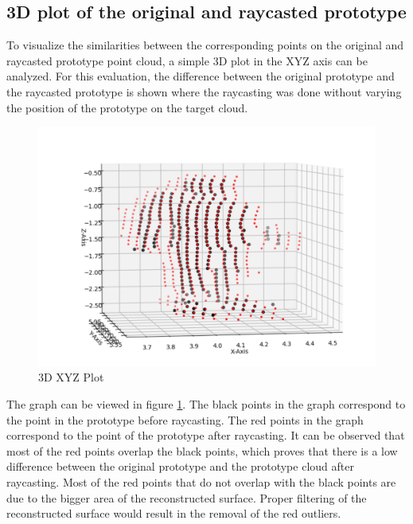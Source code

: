 \subsection{3D plot of the original and raycasted prototype}\label{sec:3dplot}
To visualize the similarities between the corresponding points on the original and raycasted prototype point cloud, a simple 3D plot in the XYZ axis can be analyzed. For this evaluation, the difference between the original prototype and the raycasted prototype is shown where the raycasting was done without varying the position of the prototype on the target cloud.

\begin{figure}[htbp]
    \centering
    \includegraphics[width=1\linewidth]{97_graphics/evaluation/3dxyz_plot.pdf}
    \caption{3D XYZ Plot}
    \label{fig:evaluation_3dplot}
\end{figure}

The graph can be viewed in figure \ref{fig:evaluation_3dplot}. The black points in the graph correspond to the point in the prototype before raycasting. The red points in the graph correspond to the point of the prototype after raycasting. It can be observed that most of the red points overlap the black points, which proves that there is a low difference between the original prototype and the prototype cloud after raycasting. Most of the red points that do not overlap with the black points are due to the bigger area of the reconstructed surface. Proper filtering of the reconstructed surface would result in the removal of the red outliers.

